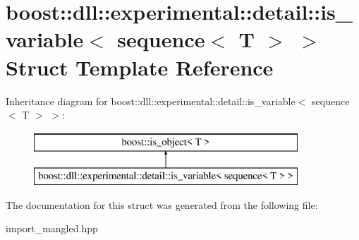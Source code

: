 \hypertarget{a00181}{}\section{boost\+:\+:dll\+:\+:experimental\+:\+:detail\+:\+:is\+\_\+variable$<$ sequence$<$ T $>$ $>$ Struct Template Reference}
\label{a00181}
Inheritance diagram for boost\+:\+:dll\+:\+:experimental\+:\+:detail\+:\+:is\+\_\+variable$<$ sequence$<$ T $>$ $>$\+:\begin{figure}[H]
\begin{center}
\leavevmode
\includegraphics[height=2.000000cm]{a00181}
\end{center}
\end{figure}


The documentation for this struct was generated from the following file\+:\begin{DoxyCompactItemize}
\item 
import\+\_\+mangled.\+hpp\end{DoxyCompactItemize}

